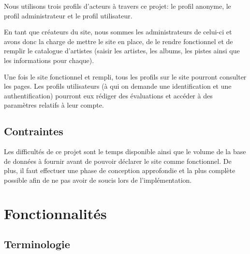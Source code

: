   \begin{paragraphe}
    Nous utilisons trois profils d’acteurs à travers ce projet: le profil
    anonyme, le profil administrateur et le profil utilisateur.\par
    En tant que créateurs du site, nous sommes les administrateurs de celui-ci
    et avons donc la charge de mettre le site en place, de le rendre
    fonctionnel et de remplir le catalogue d'artistes (saisir les artistes, les
    albums, les pistes ainsi que les informations pour chaque).\par
    Une fois le site fonctionnel et rempli, tous les profils sur le site pourront consulter les pages.
    Les profils utilisateurs (à qui on demande une identification et une authentification) pourront eux rédiger des évaluations et accéder à des paramètres relatifs à leur compte.
  \end{paragraphe}

  \subsection{Contraintes}

  \begin{paragraphe}
    Les difficultés de ce projet sont le temps disponible ainsi que le volume
    de la base de données à fournir avant de pouvoir déclarer le site comme
    fonctionnel. De plus, il faut effectuer une phase de conception approfondie et la plus complète possible afin de ne pas avoir de soucis lors de l'implémentation.
  \end{paragraphe}

\section{Fonctionnalités}

  \subsection{Terminologie}

